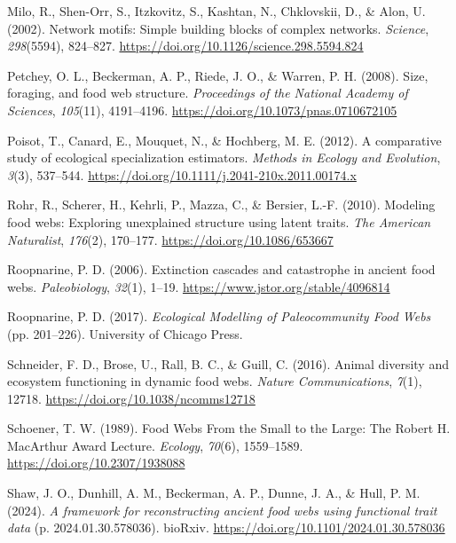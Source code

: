 \documentclass[
]{article}
\newlength{\cslhangindent}
\newenvironment{CSLReferences}[2] %
 {\begin{list}{}{%
  \setlength{\itemindent}{0pt}
  \setlength{\leftmargin}{0pt}
  \setlength{\parsep}{0pt}
  \ifodd #1
   \setlength{\leftmargin}{\cslhangindent}
   \setlength{\itemindent}{-1\cslhangindent}
  \fi
  \setlength{\itemsep}{#2\baselineskip}}}
 {\end{list}}
\begin{document}
\begin{CSLReferences}{1}{0}
Milo, R., Shen-Orr, S., Itzkovitz, S., Kashtan, N., Chklovskii, D., \&
Alon, U. (2002). Network motifs: Simple building blocks of complex
networks. \emph{Science}, \emph{298}(5594), 824--827.
\url{https://doi.org/10.1126/science.298.5594.824}

Petchey, O. L., Beckerman, A. P., Riede, J. O., \& Warren, P. H. (2008).
Size, foraging, and food web structure. \emph{Proceedings of the
National Academy of Sciences}, \emph{105}(11), 4191--4196.
\url{https://doi.org/10.1073/pnas.0710672105}

Poisot, T., Canard, E., Mouquet, N., \& Hochberg, M. E. (2012). A
comparative study of ecological specialization estimators. \emph{Methods
in Ecology and Evolution}, \emph{3}(3), 537--544.
\url{https://doi.org/10.1111/j.2041-210x.2011.00174.x}

Rohr, R., Scherer, H., Kehrli, P., Mazza, C., \& Bersier, L.-F. (2010).
Modeling food webs: Exploring unexplained structure using latent traits.
\emph{The American Naturalist}, \emph{176}(2), 170--177.
\url{https://doi.org/10.1086/653667}

Roopnarine, P. D. (2006). Extinction cascades and catastrophe in ancient
food webs. \emph{Paleobiology}, \emph{32}(1), 1--19.
\url{https://www.jstor.org/stable/4096814}

Roopnarine, P. D. (2017). \emph{Ecological Modelling of Paleocommunity
Food Webs} (pp. 201--226). University of Chicago Press.

Schneider, F. D., Brose, U., Rall, B. C., \& Guill, C. (2016). Animal
diversity and ecosystem functioning in dynamic food webs. \emph{Nature
Communications}, \emph{7}(1), 12718.
\url{https://doi.org/10.1038/ncomms12718}

Schoener, T. W. (1989). Food Webs From the Small to the Large: The
Robert H. MacArthur Award Lecture. \emph{Ecology}, \emph{70}(6),
1559--1589. \url{https://doi.org/10.2307/1938088}

Shaw, J. O., Dunhill, A. M., Beckerman, A. P., Dunne, J. A., \& Hull, P.
M. (2024). \emph{A framework for reconstructing ancient food webs using
functional trait data} (p. 2024.01.30.578036). bioRxiv.
\url{https://doi.org/10.1101/2024.01.30.578036}


\end{CSLReferences}
\end{document}
